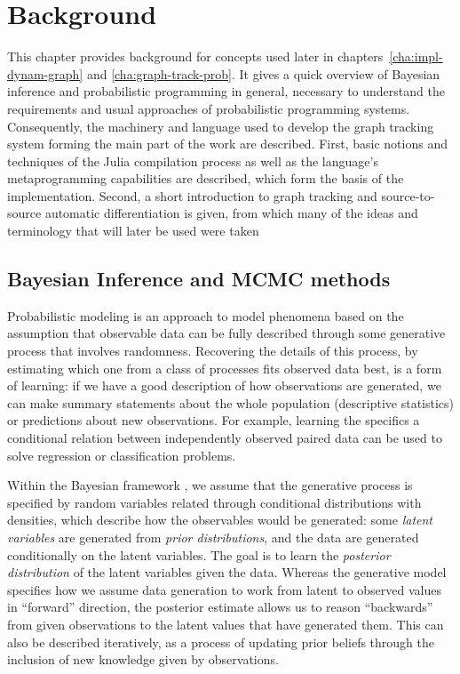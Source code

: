 \chapter{Background}
\label{cha:background}

This chapter provides background for concepts used later in chapters~\ref{cha:impl-dynam-graph} and
\ref{cha:graph-track-prob}.  It gives a quick overview of Bayesian inference and probabilistic
programming in general, necessary to understand the requirements and usual approaches of
probabilistic programming systems.  Consequently, the machinery and language used to develop the
graph tracking system forming the main part of the work are described.  First, basic notions and
techniques of the Julia compilation process as well as the language's metaprogramming capabilities
are described, which form the basis of the implementation.  Second, a short introduction to graph
tracking and source-to-source automatic differentiation is given, from which many of the ideas and
terminology that will later be used were taken


\section{Bayesian Inference and MCMC methods}
\label{sec:bayes-infer}

Probabilistic modeling \parencite{winn2019modelbased} is an approach to model phenomena based on the
assumption that observable data can be fully described through some generative process that involves
randomness.  Recovering the details of this process, by estimating which one from a class of
processes fits observed data best, is a form of learning: if we have a good description of how
observations are generated, we can make summary statements about the whole population (descriptive
statistics) or predictions about new observations.  For example, learning the specifics a
conditional relation between independently observed paired data can be used to solve regression or
classification problems.

Within the Bayesian framework
\parencite{bolstad2004introduction,congdon2006bayesian,gelman2020bayesian}, we assume that the
generative process is specified by random variables related through conditional distributions with
densities, which describe how the observables would be generated: some \emph{latent variables} are
generated from \emph{prior distributions}, and the data are generated conditionally on the latent
variables.  The goal is to learn the \emph{posterior distribution} of the latent variables given the
data.  Whereas the generative model specifies how we assume data generation to work from latent to
observed values in \enquote{forward} direction, the posterior estimate allows us to reason
\enquote{backwards} from given observations to the latent values that have generated them.  This can
also be described iteratively, as a process of updating prior beliefs through the inclusion of new
knowledge given by observations.


